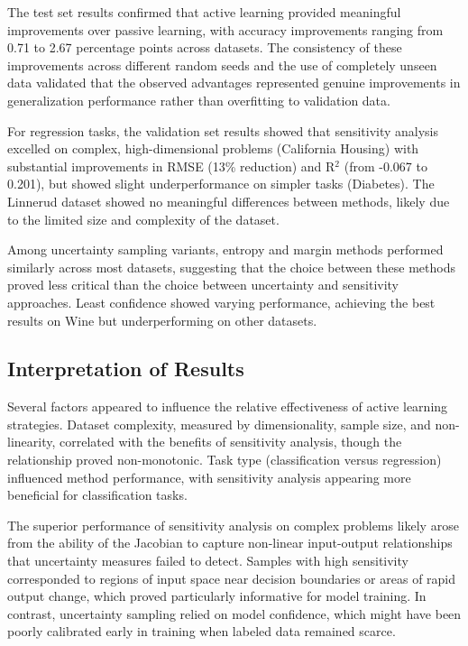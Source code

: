 \documentclass[conference]{IEEEtran}
\begin{document}
The test set results confirmed that active learning provided meaningful improvements over passive learning, with accuracy improvements ranging from 0.71 to 2.67 percentage points across datasets. The consistency of these improvements across different random seeds and the use of completely unseen data validated that the observed advantages represented genuine improvements in generalization performance rather than overfitting to validation data.

For regression tasks, the validation set results showed that sensitivity analysis excelled on complex, high-dimensional problems (California Housing) with substantial improvements in RMSE (13\% reduction) and R$^2$ (from -0.067 to 0.201), but showed slight underperformance on simpler tasks (Diabetes). The Linnerud dataset showed no meaningful differences between methods, likely due to the limited size and complexity of the dataset.

Among uncertainty sampling variants, entropy and margin methods performed similarly across most datasets, suggesting that the choice between these methods proved less critical than the choice between uncertainty and sensitivity approaches. Least confidence showed varying performance, achieving the best results on Wine but underperforming on other datasets.

\subsection{Interpretation of Results}

Several factors appeared to influence the relative effectiveness of active learning strategies. Dataset complexity, measured by dimensionality, sample size, and non-linearity, correlated with the benefits of sensitivity analysis, though the relationship proved non-monotonic. Task type (classification versus regression) influenced method performance, with sensitivity analysis appearing more beneficial for classification tasks.

The superior performance of sensitivity analysis on complex problems likely arose from the ability of the Jacobian to capture non-linear input-output relationships that uncertainty measures failed to detect. Samples with high sensitivity corresponded to regions of input space near decision boundaries or areas of rapid output change, which proved particularly informative for model training. In contrast, uncertainty sampling relied on model confidence, which might have been poorly calibrated early in training when labeled data remained scarce.
\end{document}
